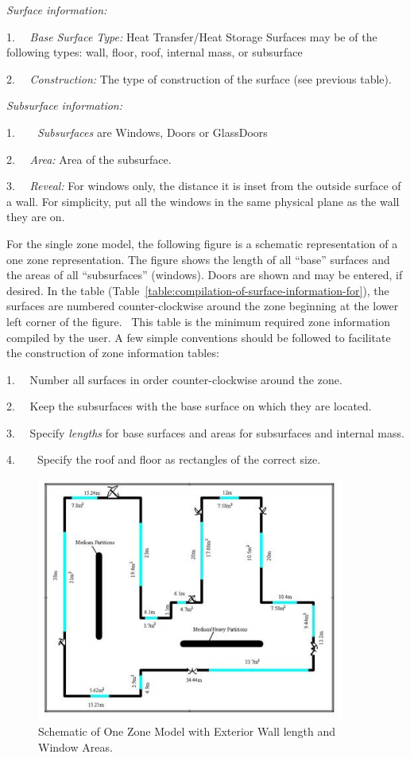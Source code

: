 \emph{Surface information:}

1.~~ \emph{Base} \emph{Surface Type:} Heat Transfer/Heat Storage Surfaces may be of the following types: wall, floor, roof, internal mass, or subsurface

2.~~ \emph{Construction:} The type of construction of the surface (see previous table).

\emph{Subsurface information:}

1.~~~~\emph{Subsurfaces} are Windows, Doors or GlassDoors

2.~~ \emph{Area:} Area of the subsurface.

3.~~ \emph{Reveal:} For windows only, the distance it is inset from the outside surface of a wall. For simplicity, put all the windows in the same physical plane as the wall they are on.

For the single zone model, the following figure is a schematic representation of a one zone representation. The figure shows the length of all ``base'' surfaces and the areas of all ``subsurfaces'' (windows). Doors are shown and may be entered, if desired. In the table (Table~\ref{table:compilation-of-surface-information-for}), the surfaces are numbered counter-clockwise around the zone beginning at the lower left corner of the figure. ~This table is the minimum required zone information compiled by the user. A few simple conventions should be followed to facilitate the construction of zone information tables:

1.~~ Number all surfaces in order counter-clockwise around the zone.

2.~~ Keep the subsurfaces with the base surface on which they are located.

3.~~ Specify \emph{lengths} for base surfaces and areas for subsurfaces and internal mass.

4.~~~~Specify the roof and floor as rectangles of the correct size.

\begin{figure}[hbtp] %
\centering
\includegraphics[width=0.9\textwidth, height=0.9\textheight, keepaspectratio=true]{media/image017.jpg}
\caption{Schematic of One Zone Model with Exterior Wall length and Window Areas. \protect \label{fig:schematic-of-one-zone-model-with-exterior}}
\end{figure}

